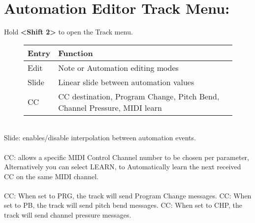 \section{Automation Editor Track Menu:}
Hold \textbf{<Shift 2>} to open the Track menu.
\begin{figure}[hb]
    \begin{tabular}{|l|l|}
    \hline
    \rowcolor[HTML]{C0C0C0}
    Entry        & Function \\ \hline
    Edit         & Note or Automation editing modes\\ \hline
    Slide      & Linear slide between automation values \\ \hline
    CC         & CC destination, Program Change, Pitch Bend, Channel Pressure,  MIDI learn \\ \hline
    \end{tabular}
\end{figure}
\\
Slide: enables/disable interpolation between automation events.\\\\
CC: allows a specific MIDI Control Channel number to be chosen per parameter, Alternatively you can select LEARN, to Automatically learn the next received CC on the same MIDI channel.\\\\
CC: When set to PRG, the track will send Program Change messages.
CC: When set to PB, the track will send pitch bend messages.
CC: When set to CHP, the track will send channel pressure messages.


